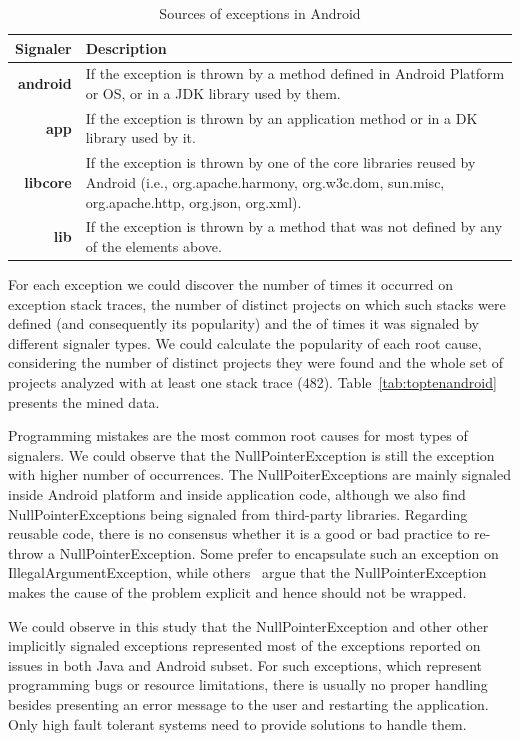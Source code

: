 \documentclass[conference]{IEEEtran}
\begin{document}
\begin{table}
  \centering
  \begin{tabular}{rp{29em}}
    \hline
    \bfseries{Signaler} & \bfseries{Description} \\
    \hline
    \bfseries{android} & If the exception is thrown by a method defined in Android Platform or OS, or in a JDK library used by them.\\
    \bfseries{app}     & If the exception is thrown by an application method or in a  DK library used by it.\\
    \bfseries{libcore} & If the exception is thrown by one of the core libraries reused by Android (i.e., org.apache.harmony, org.w3c.dom, sun.misc, org.apache.http, org.json, org.xml). \\
    \bfseries{lib}     & If the exception is thrown by a method that was not defined by any of the elements above.\\
    \hline
  \end{tabular}
  \caption{Sources of exceptions in Android}
  \label{tab:signalers}
\end{table}

For each exception we could discover the number of times it occurred on exception stack traces,
the number of distinct projects on which such stacks were defined (and consequently its
popularity) and the of times it was signaled by different signaler types. We
could calculate the popularity of each root cause, considering the number of
distinct projects they were found and the whole set of projects analyzed with at
least one stack trace (482). Table~\ref{tab:toptenandroid} 
presents the mined data.

Programming mistakes are the most common root causes for most types of signalers. We
could observe that the NullPointerException is still the exception with higher
number of occurrences. The NullPoiterExceptions are mainly signaled inside
Android platform and inside application code, although we also find
NullPointerExceptions being signaled from third-party libraries. Regarding
reusable code, there is no consensus whether it is a good or bad practice to 
re-throw
a NullPointerException. Some prefer to encapsulate such an exception on
IllegalArgumentException, while others~\cite{bloch2008effective} argue that the
NullPointerException makes the cause of the problem explicit and hence 
should not be wrapped.

We could observe in this study that the NullPointerException and other
other implicitly signaled exceptions represented most of the exceptions reported
on issues in both Java and Android subset. For such exceptions, which represent
programming bugs or resource limitations, there is usually no proper handling
besides presenting an error message to the user and restarting the application.
Only high fault tolerant systems need to provide solutions to handle them.
\end{document}
